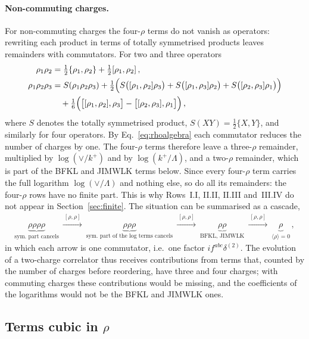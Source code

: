 \paragraph{Non-commuting charges.} For non-commuting charges the four-$\rho$ terms do not vanish as operators: rewriting each product in terms of totally symmetrised products leaves remainders with commutators. For two and three operators
\begin{align}\label{eq:symmetrise}
\rho_1\rho_2&=\tfrac12\{\rho_1,\rho_2\}+\tfrac12[\rho_1,\rho_2]\,,\notag\\
\rho_1\rho_2\rho_3&=S(\rho_1\rho_2\rho_3)+\tfrac12\Big(S\big([\rho_1,\rho_2]\rho_3\big)+S\big([\rho_1,\rho_3]\rho_2\big)+S\big([\rho_2,\rho_3]\rho_1\big)\Big)\notag\\&\quad+\tfrac16\Big(\big[[\rho_1,\rho_2],\rho_3\big]-\big[[\rho_2,\rho_3],\rho_1\big]\Big)\,,
\end{align}
where $S$ denotes the totally symmetrised product, $S(XY)=\frac12\{X,Y\}$, and similarly for four operators. By Eq.~\eqref{eq:rhoalgebra} each commutator reduces the number of charges by one. The four-$\rho$ terms therefore leave a three-$\rho$ remainder, multiplied by $\log(\vee/k^+)$ and by $\log(k^+/\Lambda)$, and a two-$\rho$ remainder, which is part of the BFKL and JIMWLK terms below. Since every four-$\rho$ term carries the full logarithm $\log(\vee/\Lambda)$ and nothing else, so do all its remainders: the four-$\rho$ rows have no finite part. This is why Rows~I.I, II.II, II.III and~III.IV do not appear in Section~\ref{sec:finite}. The situation can be summarised as a cascade,
\begin{align}\label{eq:cascade}
\underbrace{\rho\rho\rho\rho}_{\text{sym.\ part cancels}}\ \xrightarrow{\ [\rho,\rho]\ }\ \underbrace{\rho\rho\rho}_{\text{sym.\ part of the log terms cancels}}\ \xrightarrow{\ [\rho,\rho]\ }\ \underbrace{\rho\rho}_{\text{BFKL, JIMWLK}}\ \xrightarrow{\ [\rho,\rho]\ }\ \underbrace{\rho}_{\langle\rho\rangle=0}\,,
\end{align}
in which each arrow is one commutator, i.e.\ one factor $if^{abc}\delta^{(2)}$. The evolution of a two-charge correlator thus receives contributions from terms that, counted by the number of charges before reordering, have three and four charges; with commuting charges these contributions would be missing, and the coefficients of the logarithms would not be the BFKL and JIMWLK ones.

\subsection{Terms cubic in \texorpdfstring{$\rho$}{rho}}\label{sec:threerho}

